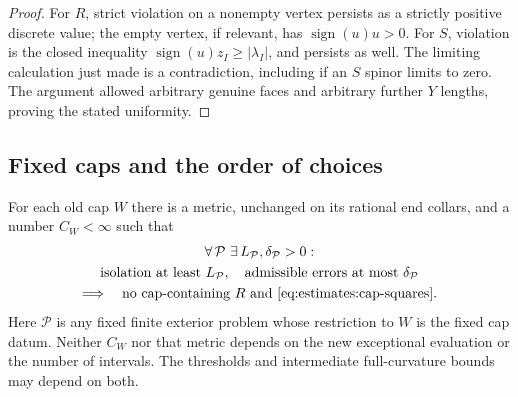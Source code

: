 \begin{proof}
For $R$, strict violation on a nonempty vertex persists as a
strictly positive discrete value; the empty vertex, if relevant,
has $\operatorname{sign}(u)u>0$.  For $S$, violation is the closed
inequality $\operatorname{sign}(u)z_I\geq|\lambda_I|$, and persists
as well.  The limiting calculation just made is a contradiction,
including if an $S$ spinor limits to zero.  The argument allowed
arbitrary genuine faces and arbitrary further $Y$ lengths, proving
the stated uniformity.
\end{proof}

\subsection{Fixed caps and the order of choices}

\begin{proposition}
\label{prop:estimates:cap}
For each old cap $W$ there is a metric, unchanged on its rational
end collars, and a number $C_W<\infty$ such that
\[
 \begin{gathered}
 \forall\,\mathcal P\ \exists\,L_{\mathcal P},\delta_{\mathcal P}>0:\\
 \text{isolation at least }L_{\mathcal P},\quad
 \text{admissible errors at most }\delta_{\mathcal P}\\
 \Longrightarrow\quad
 \text{no cap-containing }R\text{ and \eqref{eq:estimates:cap-squares}.}
 \end{gathered}
\]
Here $\mathcal P$ is any fixed finite exterior problem whose
restriction to $W$ is the fixed cap datum.  Neither $C_W$ nor that
metric depends on the new exceptional evaluation or the number of
intervals.  The thresholds and intermediate full-curvature bounds
may depend on both.
\end{proposition}

